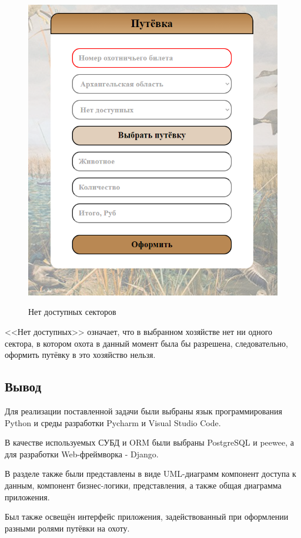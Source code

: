 	\begin{figure}[h!]
		\centering
		\begin{center}
			{\includegraphics[scale=0.5]{schemes/screens/no_data.png}}
			\caption{Нет доступных секторов}
			\label{fig35:image}
		\end{center}
	\end{figure}

	<<Нет доступных>> означает, что в выбранном хозяйстве нет ни одного сектора, в котором охота в данный момент была бы разрешена, следовательно, оформить путёвку в это хозяйство нельзя.
	
	\subsection*{Вывод}
	Для реализации поставленной задачи были выбраны язык программирования Python и среды разработки Pycharm и Visual Studio Code.
	
	В качестве используемых СУБД и ORM были выбраны PostgreSQL и peewee, а для разработки Web-фреймворка - Django.
	
	В разделе также были представлены в виде UML-диаграмм компонент доступа к данным, компонент бизнес-логики, представления, а также общая диаграмма приложения.
	
	Был также освещён интерфейс приложения, задействованный при оформлении разными ролями путёвки на охоту.
	
	
	
	
	










	
	
		
		 
		
	